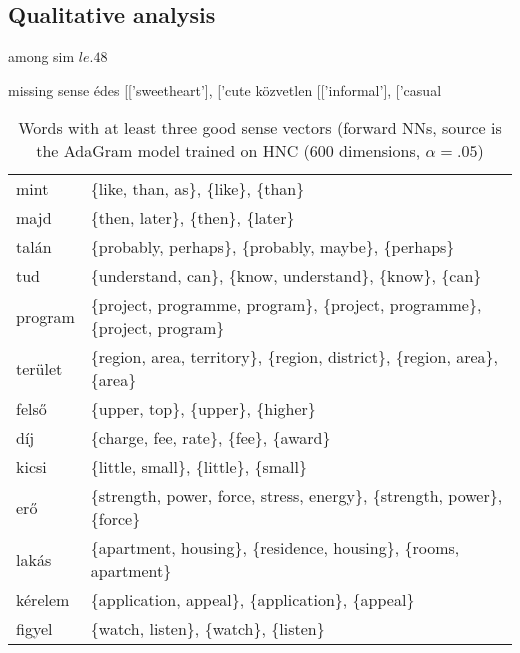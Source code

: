 \documentclass[11pt]{article}
\begin{document}
\subsection{Qualitative analysis}

among sim $le.48$ %


missing sense
  édes [['sweetheart'], ['cute
  közvetlen [['informal'], ['casual

\begin{table*}[t]
  \begin{tabular}{ll}
    \toprule
mint	& \{like, than, as\}, \{like\}, \{than\}	\\
majd	& \{then, later\}, \{then\}, \{later\}	\\
talán	& \{probably, perhaps\}, \{probably, maybe\}, \{perhaps\}	\\
tud	& \{understand, can\}, \{know, understand\}, \{know\}, \{can\}	\\
program	& \{project, programme, program\}, \{project, programme\}, \{project, program\}	\\
terület	& \{region, area, territory\}, \{region, district\}, \{region, area\}, \{area\}	\\
felső	& \{upper, top\}, \{upper\}, \{higher\}	\\
díj	& \{charge, fee, rate\}, \{fee\}, \{award\}	\\
kicsi	& \{little, small\}, \{little\}, \{small\}	\\
erő	& \{strength, power, force, stress, energy\}, \{strength, power\}, \{force\}	\\
lakás	& \{apartment, housing\}, \{residence, housing\}, \{rooms, apartment\}	\\
kérelem	& \{application, appeal\}, \{application\}, \{appeal\}	\\
figyel	& \{watch, listen\}, \{watch\}, \{listen\}	\\
\bottomrule
\end{tabular}
  \caption{Words with at least three good sense vectors (forward NNs, source is
  the AdaGram model trained on HNC (600 dimensions, $\alpha=.05$)}
  \label{tab:like_than}
\end{table*}
\end{document}
